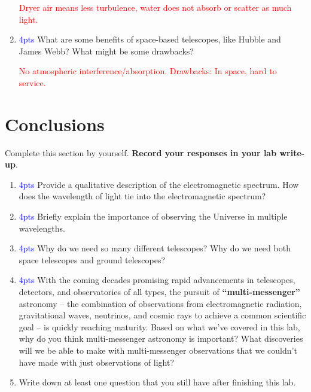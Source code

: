\documentclass[11pt]{article}
\begin{document}
\begin{enumerate}
    \textcolor{red}{Dryer air means less turbulence, water does not absorb or scatter as much light.}
    
    \item \textcolor{blue}{4pts} What are some benefits of space-based telescopes, like Hubble and James Webb? What might be some drawbacks?
    
    \textcolor{red}{No atmospheric interference/absorption. Drawbacks: In space, hard to service.}
\end{enumerate}

\section{Conclusions}

Complete this section by yourself. \textbf{Record your responses in your lab write-up}.
\begin{enumerate}
    \item \textcolor{blue}{4pts} Provide a qualitative description of the electromagnetic spectrum. How does the wavelength of light tie into the electromagnetic spectrum?
    
    \item \textcolor{blue}{4pts} Briefly explain the importance of observing the Universe in multiple wavelengths. 
    
    \item \textcolor{blue}{4pts} Why do we need so many different telescopes? Why do we need both space telescopes and ground telescopes?
    
    \item \textcolor{blue}{4pts} With the coming decades promising rapid advancements in telescopes, detectors, and observatories of all types, the pursuit of \textbf{``multi-messenger''} astronomy -- the combination of observations from electromagnetic radiation, gravitational waves, neutrinos, and cosmic rays to achieve a common scientific goal -- is quickly reaching maturity. Based on what we've covered in this lab, why do you think multi-messenger astronomy is important? What discoveries will we be able to make with multi-messenger observations that we couldn't have made with just observations of light?
    
    \item Write down at least one question that you still have after finishing this lab.
    
\end{enumerate}
\end{document}
